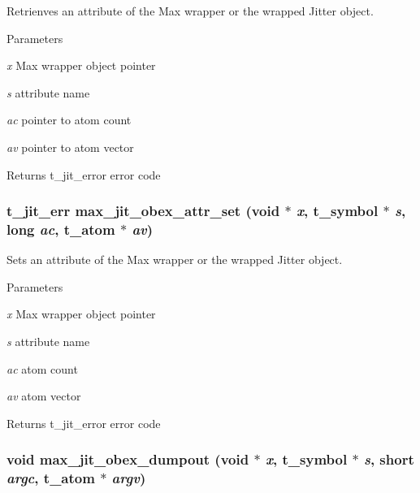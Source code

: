 Retrienves an attribute of the Max wrapper or the wrapped Jitter object. 
\begin{DoxyParams}{Parameters}
\item[{\em x}]Max wrapper object pointer \item[{\em s}]attribute name \item[{\em ac}]pointer to atom count \item[{\em av}]pointer to atom vector\end{DoxyParams}
\begin{DoxyReturn}{Returns}
t\_\-jit\_\-error error code 
\end{DoxyReturn}
\hypertarget{group__maxwrapmod_gabb838d64e492c2a6bd718e2814862246}{
\subsubsection[{max\_\-jit\_\-obex\_\-attr\_\-set}]{\setlength{\rightskip}{0pt plus 5cm}t\_\-jit\_\-err max\_\-jit\_\-obex\_\-attr\_\-set (void $\ast$ {\em x}, \/  {\bf t\_\-symbol} $\ast$ {\em s}, \/  long {\em ac}, \/  {\bf t\_\-atom} $\ast$ {\em av})}}
\label{group__maxwrapmod_gabb838d64e492c2a6bd718e2814862246}


Sets an attribute of the Max wrapper or the wrapped Jitter object. 
\begin{DoxyParams}{Parameters}
\item[{\em x}]Max wrapper object pointer \item[{\em s}]attribute name \item[{\em ac}]atom count \item[{\em av}]atom vector\end{DoxyParams}
\begin{DoxyReturn}{Returns}
t\_\-jit\_\-error error code 
\end{DoxyReturn}
\hypertarget{group__maxwrapmod_ga161cd54f4612d26057e4140b56e14729}{
\subsubsection[{max\_\-jit\_\-obex\_\-dumpout}]{\setlength{\rightskip}{0pt plus 5cm}void max\_\-jit\_\-obex\_\-dumpout (void $\ast$ {\em x}, \/  {\bf t\_\-symbol} $\ast$ {\em s}, \/  short {\em argc}, \/  {\bf t\_\-atom} $\ast$ {\em argv})}}
\label{group__maxwrapmod_ga161cd54f4612d26057e4140b56e14729}


